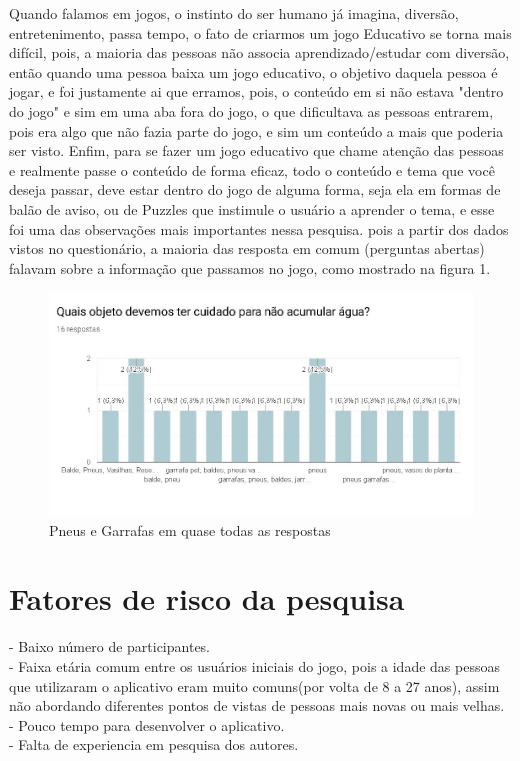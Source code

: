 \documentclass[12pt]{article}
\begin{document}
		Quando falamos em jogos, o instinto do ser humano já imagina, diversão, entretenimento, passa tempo, o fato de criarmos um jogo Educativo se torna mais difícil, pois, a maioria das pessoas não associa aprendizado/estudar com diversão, então quando uma pessoa baixa um jogo educativo, o objetivo daquela pessoa é jogar, e foi justamente ai que erramos, pois, o conteúdo em si não estava "dentro do jogo" e sim em uma aba fora do jogo, o que dificultava as pessoas entrarem, pois era algo que não fazia parte do jogo, e sim um conteúdo a mais que poderia ser visto. Enfim, para se fazer um jogo educativo que chame atenção das pessoas e realmente passe o conteúdo de forma eficaz, todo o conteúdo e tema que você deseja passar, deve estar dentro do jogo de alguma forma, seja ela em formas de balão de aviso, ou de Puzzles que instimule o usuário a aprender o tema, e esse foi uma das observações mais importantes nessa pesquisa. pois a partir dos dados vistos no questionário, a maioria das resposta em comum (perguntas abertas) falavam sobre a informação que passamos no jogo, como mostrado na figura 1.
		\begin{figure}[H]
			\centering
			\caption{Pneus e Garrafas em quase todas as respostas}
			\includegraphics[width=0.7\linewidth]{Figuras/Pergunta_6}
			
			\label{fig:pergunta5}
		\end{figure}

	\section{Fatores de risco da pesquisa}
		- Baixo número de participantes.\\
		- Faixa etária comum entre os usuários iniciais do jogo, pois a idade das pessoas que utilizaram o aplicativo eram muito comuns(por volta de 8 a 27 anos), assim não abordando diferentes pontos de vistas de pessoas mais novas ou mais velhas.\\
		- Pouco tempo para desenvolver o aplicativo.\\
		- Falta de experiencia em pesquisa dos autores.\\
		
\end{document}
